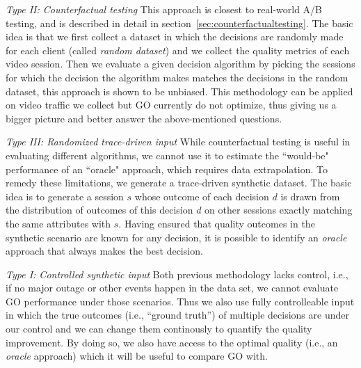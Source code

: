 

{\it Type II: Counterfactual testing} This approach is closest to real-world A/B testing, and is described in detail in section~\ref{sec:counterfactualtesting}. The basic idea is that we first collect a dataset in which the decisions are randomly made for each client (called {\it random dataset}) and we collect the quality metrics of each video session. Then we evaluate a given decision algorithm by picking the sessions for which the decision the algorithm makes matches the decisions in the random dataset, this approach is shown to be unbiased. This methodology can be applied on video traffic we collect but GO currently do not optimize, thus giving us a bigger picture and better answer the above-mentioned questions.

{\it Type III: Randomized trace-driven input} While counterfactual testing is useful in evaluating different algorithms, we cannot use it to estimate the ``would-be" performance of an ``oracle" approach, which requires data extrapolation. To remedy these limitations, we generate a trace-driven synthetic dataset. The basic idea is to generate a session $s$ whose outcome of each decision $d$ is drawn from the distribution of outcomes of this decision $d$ on other sessions exactly matching the same attributes with $s$. Having ensured that quality outcomes in the synthetic scenario are known for any decision, it is possible to identify an {\it oracle} approach that always makes the best decision.

{\it Type I: Controlled synthetic input} Both previous methodology lacks control, i.e., if no major outage or other events happen in the data set, we cannot evaluate GO performance under those scenarios.  Thus we also use fully controlleable input in which the true outcomes (i.e., ``ground truth'') of multiple decisions are under our control and we can change them continously to quantify the quality improvement. By doing so, we also have access to the optimal quality (i.e., an {\it oracle} approach) which it will be useful to compare GO with.

